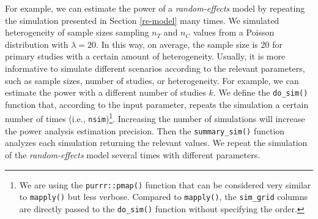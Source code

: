 \documentclass[
  man,floatsintext]{apa6}
\begin{document}
For example, we can estimate the power of a \emph{random-effects} model by repeating the simulation presented in Section \ref{re-model} many times. We simulated heterogeneity of sample sizes sampling \(n_{T}\) and \(n_{C}\) values from a Poisson distribution with \(\lambda = 20\). In this way, on average, the sample size is 20 for primary studies with a certain amount of heterogeneity. Usually, it is more informative to simulate different scenarios according to the relevant parameters, such as sample sizes, number of studies, or heterogeneity. For example, we can estimate the power with a different number of studies \(k\). We define the \texttt{do\_sim()} function that, according to the input parameter, repeats the simulation a certain number of times (i.e., \texttt{nsim})\footnote{We are using the \texttt{purrr::pmap()} function that can be considered very similar to \texttt{mapply()} but less verbose. Compared to \texttt{mapply()}, the \texttt{sim\_grid} columns are directly passed to the \texttt{do\_sim()} function without specifying the order.}. Increasing the number of simulations will increase the power analysis estimation precision. Then the \texttt{summary\_sim()} function analyzes each simulation returning the relevant values. We repeat the simulation of the \emph{random-effects} model several times with different parameters.

\scriptsize
\end{document}
